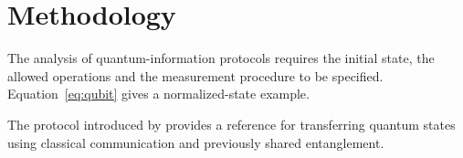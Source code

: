 \chapter{Methodology}
The analysis of quantum-information protocols requires the initial state, the allowed operations and the measurement procedure to be specified. Equation~\eqref{eq:qubit} gives a normalized-state example.

The protocol introduced by \textcite{bennett1993} provides a reference for transferring quantum states using classical communication and previously shared entanglement.
